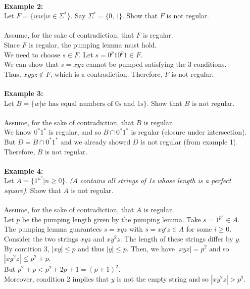 \documentclass[11pt]{article}
\begin{document}
$\quad$\\[-1em]
\textbf{Example 2:}\\
Let $F=\{ww|w\in\Sigma^{\ast}\}$. Say $\Sigma^{\ast}=\{0,1\}$. Show that $F$ is not regular.
\\\\
Assume, for the sake of contradiction, that $F$ is regular. \\
Since $F$ is regular, the pumping lemma must hold. \\
We need to choose $s\in F$. Let $s=0^p10^p1\in F$. \\
We can show that $s=xyz$ cannot be pumped satisfying the 3 conditions. \\
Thus, $xyyz\not\in F$, which is a contradiction. Therefore, $F$ is not regular.
\\\\
\textbf{Example 3:}\\
Let $B=\{w|w\text{ has equal numbers of 0s and 1s}\}$. Show that $B$ is not regular.
\\\\
Assume, for the sake of contradiction, that $B$ is regular. \\
We know $0^{\ast}1^{\ast}$ is regular, and so $B\cap 0^{\ast}1^{\ast}$ is regular (closure under intersection). \\
But $D=B\cap 0^{\ast}1^{\ast}$ and we already showed $D$ is not regular (from example 1). \\
Therefore, $B$ is not regular.
\\\\
\textbf{Example 4:}\\
Let $A=\{1^{n^2}|n\ge 0\}$. \textit{($A$ contains all strings of 1s whose length is a perfect square)}. Show that $A$ is not regular.
\\\\
Assume, for the sake of contradiction, that $A$ is regular.\\
Let $p$ be the pumping length given by the pumping lemma. Take $s=1^{p^2}\in A$.\\
The pumping lemma guarantees $s=xyz$ with $s=xy^iz\in A$ for some $i\ge 0$.\\
Consider the two strings $xyz$ and $xy^2z$. The length of these strings differ by $y$.\\
By contition 3, $|xy|\le p$ and thus $|y|\le p$. Then, we have $|xyz|=p^2$ and so $|xy^2z|\le p^2+p$.\\
But $p^2+p<p^2+2p+1=(p+1)^2$.\\
Moreover, condition 2 implies that $y$ is not the empty string and so $|xy^2z|>p^2$.\\
\end{document}
